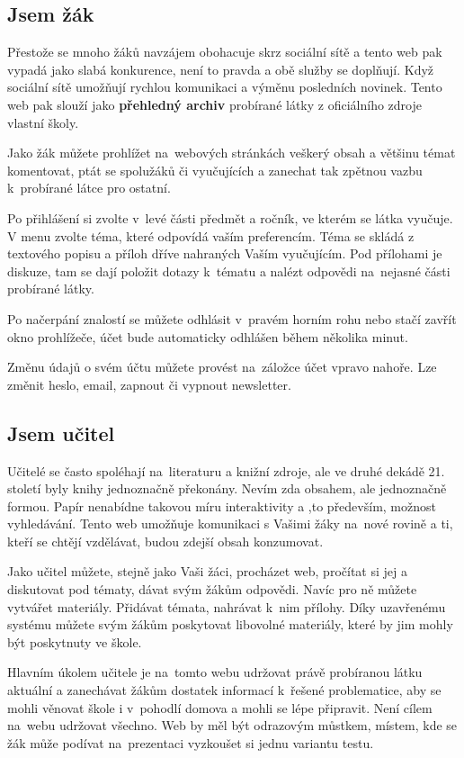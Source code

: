 \documentclass[thesis=B,czech]{FITthesis}[2012/06/26]
\begin{document}
\subsection{Jsem žák}

Přestože se mnoho žáků navzájem obohacuje skrz sociální sítě a tento web pak vypadá jako slabá konkurence, není to pravda a obě služby se doplňují. Když sociální sítě umožňují rychlou komunikaci a výměnu posledních novinek. Tento web pak slouží jako \textbf{přehledný archiv} probírané látky z oficiálního zdroje vlastní školy.

Jako žák můžete prohlížet na~webových stránkách veškerý obsah a většinu témat komentovat, ptát se spolužáků či vyučujících a zanechat tak zpětnou vazbu k~probírané látce pro ostatní.

Po přihlášení si zvolte v~levé části předmět a ročník, ve kterém se látka vyučuje. V menu zvolte téma, které odpovídá vaším preferencím. Téma se skládá z textového popisu a příloh dříve nahraných Vaším vyučujícím. Pod přílohami je diskuze, tam se dají položit dotazy k~tématu a nalézt odpovědi na~nejasné části probírané látky.

Po načerpání znalostí se můžete odhlásit v~pravém horním rohu nebo stačí zavřít okno prohlížeče, účet bude automaticky odhlášen během několika minut.

Změnu údajů o svém účtu můžete provést na~záložce účet vpravo nahoře. Lze změnit heslo, email, zapnout či vypnout newsletter.

\subsection{Jsem učitel}

Učitelé se často spoléhají na~literaturu a knižní zdroje, ale ve druhé dekádě 21. století byly knihy jednoznačně překonány. Nevím zda obsahem, ale jednoznačně formou. Papír nenabídne takovou míru interaktivity a ,to především, možnost vyhledávání. Tento web umožňuje komunikaci s Vašimi žáky na~nové rovině a ti, kteří se chtějí vzdělávat, budou zdejší obsah konzumovat.

Jako učitel můžete, stejně jako Vaši žáci, procházet web, pročítat si jej a diskutovat pod tématy, dávat svým žákům odpovědi. Navíc pro ně můžete vytvářet materiály. Přidávat témata, nahrávat k~nim přílohy. Díky uzavřenému systému můžete svým žákům poskytovat libovolné materiály, které by jim mohly být poskytnuty ve škole.

Hlavním úkolem učitele je na~tomto webu udržovat právě probíranou látku aktuální a zanechávat žákům dostatek informací k~řešené problematice, aby se mohli věnovat škole i v~pohodlí domova a mohli se lépe připravit. Není cílem na~webu udržovat všechno. Web by měl být odrazovým můstkem, místem, kde se žák může podívat na~prezentaci vyzkoušet si jednu variantu testu.
\end{document}
